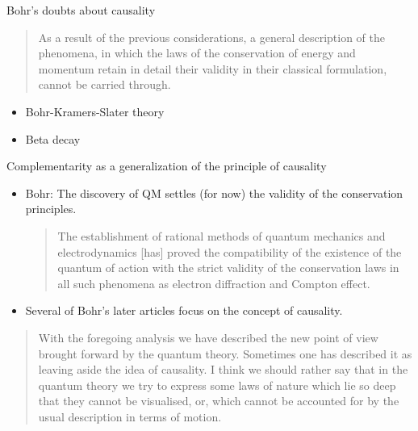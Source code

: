 \documentclass[fleqn]{beamer}
\begin{document}
\begin{frame}{Bohr's doubts about causality}

  \begin{quote} As a result of the previous considerations, a general
    description of the phenomena, in which the laws of the
    conservation of energy and momentum retain in detail their
    validity in their classical formulation, cannot be carried
    through. \citep[p 40]{bohr1924} \end{quote}

  \begin{itemize}
  \item Bohr-Kramers-Slater theory
\item Beta decay
\end{itemize}



\end{frame}

\begin{frame}{Complementarity as a generalization of the principle of
    causality}

  \begin{itemize}
  \item Bohr: The discovery of QM settles (for now) the validity of
    the conservation principles.

    \medskip \begin{quote} The establishment of rational methods of
      quantum mechanics and electrodynamics [has] proved the
      compatibility of the existence of the quantum of action with the
      strict validity of the conservation laws in all such phenomena
      as electron diffraction and Compton effect. \citep[p
      25]{conservation1936} \end{quote}
  \item Several of Bohr's later articles focus on the concept of
    causality.
  \end{itemize}

\end{frame}

\begin{frame}

  \begin{quote} With the foregoing analysis we have described the new
    point of view brought forward by the quantum theory. Sometimes one
    has described it as leaving aside the idea of causality. I think
    we should rather say that in the quantum theory we try to express
    some laws of nature which lie so deep that they cannot be
    visualised, or, which cannot be accounted for by the usual
    description in terms of motion. \citep{continuity1931} \end{quote}


\end{frame}
\end{document}
